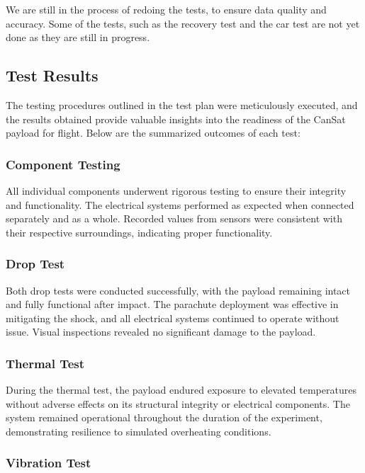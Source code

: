 We are still in the process of redoing the tests, to ensure data quality and accuracy. Some of the tests, such as the recovery test and the car test are not yet done as they are still in progress.

\subsection{Test Results}

The testing procedures outlined in the test plan were meticulously executed, and the results obtained provide valuable insights into the readiness of the CanSat payload for flight. Below are the summarized outcomes of each test:

\subsubsection{Component Testing}

All individual components underwent rigorous testing to ensure their integrity and functionality. The electrical systems performed as expected when connected separately and as a whole. Recorded values from sensors were consistent with their respective surroundings, indicating proper functionality.

\subsubsection{Drop Test}

Both drop tests were conducted successfully, with the payload remaining intact and fully functional after impact. The parachute deployment was effective in mitigating the shock, and all electrical systems continued to operate without issue. Visual inspections revealed no significant damage to the payload.

\subsubsection{Thermal Test}

During the thermal test, the payload endured exposure to elevated temperatures without adverse effects on its structural integrity or electrical components. The system remained operational throughout the duration of the experiment, demonstrating resilience to simulated overheating conditions.

\subsubsection{Vibration Test}

